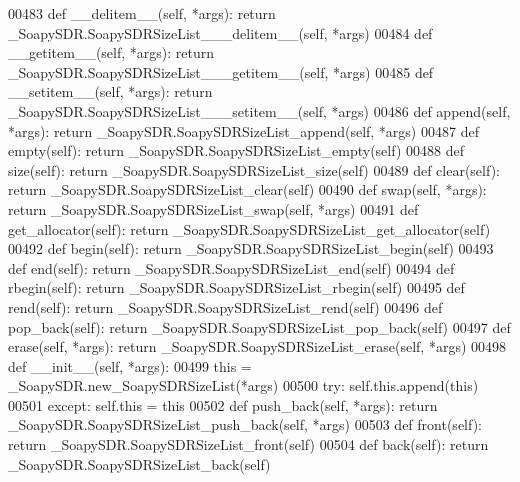 \begin{DoxyCode}
{{{{00483     \textcolor{keyword}{def }__delitem__(self, *args): \textcolor{keywordflow}{return} \_SoapySDR.SoapySDRSizeList\_\_\_delitem\_\_(self, *args)
00484     \textcolor{keyword}{def }__getitem__(self, *args): \textcolor{keywordflow}{return} \_SoapySDR.SoapySDRSizeList\_\_\_getitem\_\_(self, *args)
00485     \textcolor{keyword}{def }__setitem__(self, *args): \textcolor{keywordflow}{return} \_SoapySDR.SoapySDRSizeList\_\_\_setitem\_\_(self, *args)
00486     \textcolor{keyword}{def }append(self, *args): \textcolor{keywordflow}{return} \_SoapySDR.SoapySDRSizeList\_append(self, *args)
00487     \textcolor{keyword}{def }empty(self): \textcolor{keywordflow}{return} \_SoapySDR.SoapySDRSizeList\_empty(self)
00488     \textcolor{keyword}{def }size(self): \textcolor{keywordflow}{return} \_SoapySDR.SoapySDRSizeList\_size(self)
00489     \textcolor{keyword}{def }clear(self): \textcolor{keywordflow}{return} \_SoapySDR.SoapySDRSizeList\_clear(self)
00490     \textcolor{keyword}{def }swap(self, *args): \textcolor{keywordflow}{return} \_SoapySDR.SoapySDRSizeList\_swap(self, *args)
00491     \textcolor{keyword}{def }get_allocator(self): \textcolor{keywordflow}{return} \_SoapySDR.SoapySDRSizeList\_get\_allocator(self)
00492     \textcolor{keyword}{def }begin(self): \textcolor{keywordflow}{return} \_SoapySDR.SoapySDRSizeList\_begin(self)
00493     \textcolor{keyword}{def }end(self): \textcolor{keywordflow}{return} \_SoapySDR.SoapySDRSizeList\_end(self)
00494     \textcolor{keyword}{def }rbegin(self): \textcolor{keywordflow}{return} \_SoapySDR.SoapySDRSizeList\_rbegin(self)
00495     \textcolor{keyword}{def }rend(self): \textcolor{keywordflow}{return} \_SoapySDR.SoapySDRSizeList\_rend(self)
00496     \textcolor{keyword}{def }pop_back(self): \textcolor{keywordflow}{return} \_SoapySDR.SoapySDRSizeList\_pop\_back(self)
00497     \textcolor{keyword}{def }erase(self, *args): \textcolor{keywordflow}{return} \_SoapySDR.SoapySDRSizeList\_erase(self, *args)
00498     \textcolor{keyword}{def }__init__(self, *args): 
00499         this = \_SoapySDR.new\_SoapySDRSizeList(*args)
00500         \textcolor{keywordflow}{try}: self.this.append(this)
00501         \textcolor{keywordflow}{except}: self.this = this
00502     \textcolor{keyword}{def }push_back(self, *args): \textcolor{keywordflow}{return} \_SoapySDR.SoapySDRSizeList\_push\_back(self, *args)
00503     \textcolor{keyword}{def }front(self): \textcolor{keywordflow}{return} \_SoapySDR.SoapySDRSizeList\_front(self)
00504     \textcolor{keyword}{def }back(self): \textcolor{keywordflow}{return} \_SoapySDR.SoapySDRSizeList\_back(self)
}}}}
\end{DoxyCode}
